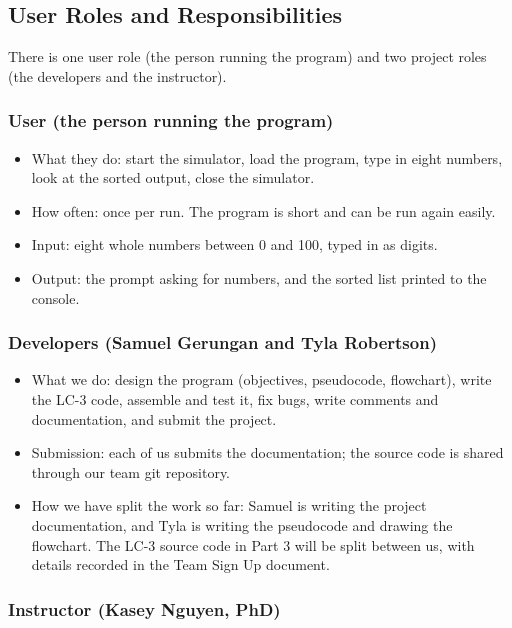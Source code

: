 \documentclass[11pt]{article}
\begin{document}
\subsection*{User Roles and Responsibilities}

There is one user role (the person running the program) and two project roles (the developers and the instructor).


\subsubsection*{User (the person running the program)}

\begin{itemize}
  \item What they do: start the simulator, load the program, type in eight numbers, look at the sorted output, close the simulator.
  \item How often: once per run. The program is short and can be run again easily.
  \item Input: eight whole numbers between 0 and 100, typed in as digits.
  \item Output: the prompt asking for numbers, and the sorted list printed to the console.
\end{itemize}
\subsubsection*{Developers (Samuel Gerungan and Tyla Robertson)}

\begin{itemize}
  \item What we do: design the program (objectives, pseudocode, flowchart), write the LC-3 code, assemble and test it, fix bugs, write comments and documentation, and submit the project.
  \item Submission: each of us submits the documentation; the source code is shared through our team git repository.
  \item How we have split the work so far: Samuel is writing the project documentation, and Tyla is writing the pseudocode and drawing the flowchart. The LC-3 source code in Part 3 will be split between us, with details recorded in the Team Sign Up document.
\end{itemize}
\subsubsection*{Instructor (Kasey Nguyen, PhD)}
\end{document}

